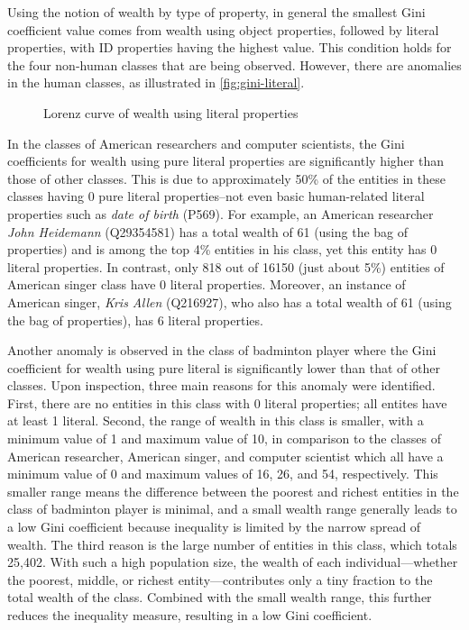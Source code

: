 Using the notion of wealth by type of property, in general the smallest Gini coefficient value comes from wealth using object properties, followed by literal properties, with ID properties having the highest value. This condition holds for the four non-human classes that are being observed. However, there are anomalies in the human classes, as illustrated in \autoref{fig:gini-literal}.

\begin{figure}[!htbp]
    \centering
    \caption{Lorenz curve of wealth using literal properties} \label{fig:gini-literal}
\end{figure}

In the classes of American researchers and computer scientists, the Gini coefficients for wealth using pure literal properties are significantly higher than those of other classes. This is due to approximately 50\% of the entities in these classes having 0 pure literal properties--not even basic human-related literal properties such as \textit{date of birth} (P569). For example, an American researcher \textit{John Heidemann} (Q29354581) has a total wealth of 61 (using the bag of properties) and is among the top 4\% entities in his class, yet this entity has 0 literal properties. In contrast, only 818 out of 16150 (just about 5\%) entities of American singer class have 0 literal properties. Moreover, an instance of American singer, \textit{Kris Allen} (Q216927), who also has a total wealth of 61 (using the bag of properties), has 6 literal properties.

Another anomaly is observed in the class of badminton player where the Gini coefficient for wealth using pure literal is significantly lower than that of other classes. Upon inspection, three main reasons for this anomaly were identified. First, there are no entities in this class with 0 literal properties; all entites have at least 1 literal. Second, the range of wealth in this class is smaller, with a minimum value of 1 and maximum value of 10, in comparison to the classes of American researcher, American singer, and computer scientist which all have a minimum value of 0 and maximum values of 16, 26, and 54, respectively. This smaller range means the difference between the poorest and richest entities in the class of badminton player is minimal, and a small wealth range generally leads to a low Gini coefficient because inequality is limited by the narrow spread of wealth. The third reason is the large number of entities in this class, which totals 25,402. With such a high population size, the wealth of each individual—whether the poorest, middle, or richest entity—contributes only a tiny fraction to the total wealth of the class. Combined with the small wealth range, this further reduces the inequality measure, resulting in a low Gini coefficient.

